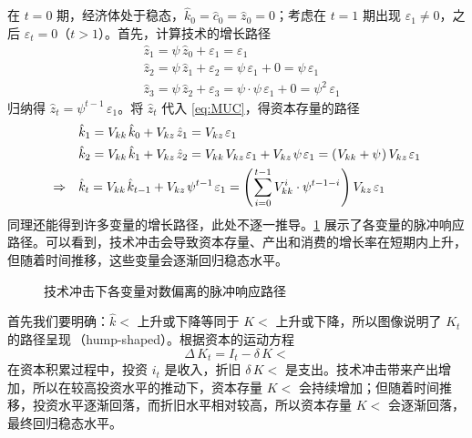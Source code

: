在 \(t=0\) 期，经济体处于稳态，\(\hat k_0=\hat c_0=\hat z_0=0\)；考虑在 \(t=1\) 期出现 \(\varepsilon_1\ne0\)，之后 \(\varepsilon_t=0\)（\(t>1\)）。首先，计算技术的增长路径
\begin{align*}
    &\hat z_1=\psi\,\hat z_0+\varepsilon_1=\varepsilon_1\\
    &\hat z_2=\psi\,\hat z_1+\varepsilon_2=\psi\,\varepsilon_1+0=\psi\,\varepsilon_1\\
    &\hat z_3=\psi\,\hat z_2+\varepsilon_3=\psi\cdot\psi\,\varepsilon_1+0=\psi^2\,\varepsilon_1
\end{align*}
归纳得 \(\hat z_t=\psi^{t-1}\,\varepsilon_1\)。将 \(\hat z_t\) 代入 \ref{eq:MUC}，得资本存量的路径
\begin{align*}
    &\hat k_1=V_{kk}\,\hat k_0+V_{kz}\,\hat z_1=V_{kz}\,\varepsilon_1\\
    &\hat k_2=V_{kk}\,\hat k_1+V_{kz}\,\hat z_2=V_{kk}\,V_{kz}\,\varepsilon_1+V_{kz}\,\psi\,\varepsilon_1=\bka{V_{kk}+\psi}V_{kz}\,\varepsilon_1\\
    \Rightarrow \quad & \hat k_t=V_{kk}\,\hat k\lt+V_{kz}\,\psi^{t-1}\,\varepsilon_1=\bka{\sum_{i=0}^{t-1}V_{kk}^i\cdot\psi^{t-1-i}}V_{kz}\,\varepsilon_1
\end{align*}
同理还能得到许多变量的增长路径，此处不逐一推导。\ref{fig:IRFfig} 展示了各变量的脉冲响应路径。可以看到，技术冲击会导致资本存量、产出和消费的增长率在短期内上升，但随着时间推移，这些变量会逐渐回归稳态水平。

\begin{figure}[H]
    \centering
  \caption{技术冲击下各变量对数偏离的脉冲响应路径}
  \label{fig:IRFfig}
\end{figure}


首先我们要明确：\(\hat k\lt\) 上升或下降等同于 \(K\lt\) 上升或下降，所以图像说明了 \(K_t\) 的路径呈现\,（hump-shaped）。根据资本的运动方程
\begin{equation*}
    \Delta \,K_t=I_t-\delta\,K\lt
\end{equation*}
在资本积累过程中，投资 \(i_t\) 是收入，折旧 \(\delta\,K\lt\) 是支出。技术冲击带来产出增加，所以在较高投资水平的推动下，资本存量 \(K\lt\) 会持续增加；但随着时间推移，投资水平逐渐回落，而折旧水平相对较高，所以资本存量 \(K\lt\) 会逐渐回落，最终回归稳态水平。

